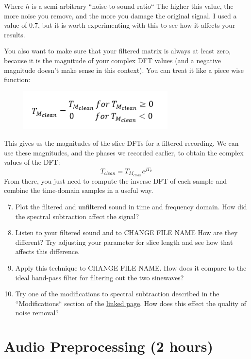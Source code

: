 \documentclass{tufte-handout}
\begin{document}
Where $h$ is a semi-arbitrary ``noise-to-sound ratio`` The higher this value, the more noise you remove, and the more you damage the original signal. I used a value of 0.7, but it is worth experimenting with this to see how it affects your results.

You also want to make sure that your filtered matrix is always at least zero, because it is the magnitude of your complex DFT values (and a negative magnitude doesn't make sense in this context). You can treat it like a piece wise function:
\begin{figure}
	\centering 
	\includegraphics[width=0.7\textwidth]{piecewise.png}
	\label{fig:piecewise}
 \end{figure}
This gives us the magnitudes of the slice DFTs for a filtered recording. We can use these magnitudes, and the phases we recorded earlier, to obtain the complex values of the DFT:
\begin{equation}
	T_{clean} = T_{M_{clean}}e^{jT_\theta}
\end{equation}
From there, you just need to compute the inverse DFT of each sample and combine the time-domain samples in a useful way.
\begin{enumerate}
	\setcounter{enumi}{6}
	\item Plot the filtered and unfiltered sound in time and frequency domain. How did the spectral subtraction affect the signal?
	\item Listen to your filtered sound and to CHANGE FILE NAME How are they different? Try adjusting your parameter for slice length and see how that affects this difference.
	\item Apply this technique to CHANGE FILE NAME. How does it compare to the ideal band-pass filter for filtering out the two sinewaves?
	\item Try one of the modifications to spectral subtraction described in the ``Modifications`` section of the \href{http://practicalcryptography.com/miscellaneous/machine-learning/tutorial-spectral-subraction/}{linked page}. How does this effect the quality of noise removal?
\end{enumerate}


\section{Audio Preprocessing (2 hours)}
\end{document}
